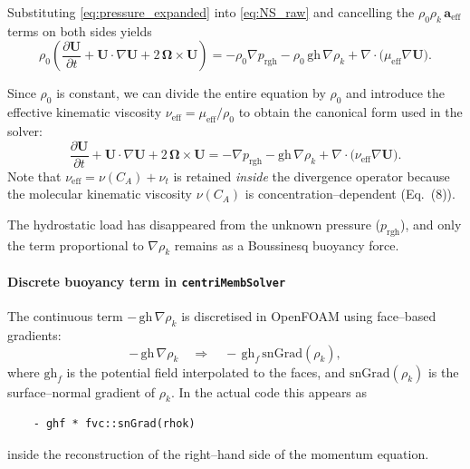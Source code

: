\documentclass[11pt,a4paper]{article}
\begin{document}
Substituting \eqref{eq:pressure_expanded} into \eqref{eq:NS_raw} and
cancelling the \(\rho_0\rho_k\,\boldsymbol{a}_{\mathrm{eff}}\) terms on
both sides yields
\begin{equation}
	\rho_0
	\left(
	\frac{\partial \boldsymbol{U}}{\partial t}
	+ \boldsymbol{U}\cdot\nabla\boldsymbol{U}
	+ 2\,\boldsymbol{\Omega}\times\boldsymbol{U}
	\right)
	=
	- \rho_0\nabla p_{\mathrm{rgh}}
	- \rho_0\,\mathrm{gh}\,\nabla\rho_k
	+ \nabla\cdot\bigl(\mu_{\mathrm{eff}}\nabla\boldsymbol{U}\bigr).
	\label{eq:NS_prgh_rho0}
\end{equation}

Since \(\rho_0\) is constant, we can divide the entire equation by
\(\rho_0\) and introduce the effective kinematic viscosity
\(\nu_{\mathrm{eff}} = \mu_{\mathrm{eff}}/\rho_0\) to obtain the
canonical form used in the solver:
\begin{equation}
	\frac{\partial \boldsymbol{U}}{\partial t}
	+ \boldsymbol{U}\cdot\nabla\boldsymbol{U}
	+ 2\,\boldsymbol{\Omega}\times\boldsymbol{U}
	=
	- \nabla p_{\mathrm{rgh}}
	- \mathrm{gh}\,\nabla\rho_k
	+ \nabla\cdot\bigl(\nu_{\mathrm{eff}}\nabla\boldsymbol{U}\bigr).
	\label{eq:NS_prgh}
\end{equation}
Note that \(\nu_{\mathrm{eff}} = \nu(C_A) + \nu_t\) is retained
\emph{inside} the divergence operator because the molecular kinematic
viscosity \(\nu(C_A)\) is concentration--dependent (Eq.~(8)).

The hydrostatic load has disappeared from the unknown pressure
(\(p_{\mathrm{rgh}}\)), and only the term proportional to
\(\nabla\rho_k\) remains as a Boussinesq buoyancy force.

\paragraph{Discrete buoyancy term in \texttt{centriMembSolver}}

The continuous term
\(-\,\mathrm{gh}\,\nabla\rho_k\)
is discretised in OpenFOAM using face–based gradients:
\begin{equation}
	-\,\mathrm{gh}\,\nabla\rho_k
	\quad\Longrightarrow\quad
	-\,\mathrm{gh}_f\,\mathrm{snGrad}(\rho_k),
\end{equation}
where \(\mathrm{gh}_f\) is the potential field interpolated to the
faces, and \(\mathrm{snGrad}(\rho_k)\) is the surface–normal gradient of
\(\rho_k\). In the actual code this appears as
\begin{verbatim}
	- ghf * fvc::snGrad(rhok)
\end{verbatim}
inside the reconstruction of the right–hand side of the momentum
equation.
\end{document}
